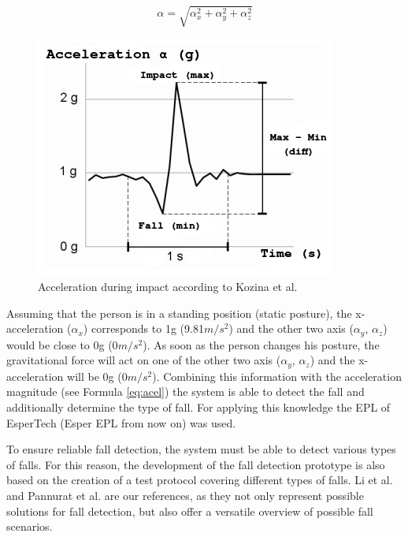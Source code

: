 \documentclass[10pt,journal,compsoc]{IEEEtran}
\begin{document}
\begin{equation}\label{eq:acel}
\alpha = \sqrt{\alpha_{x}^{2} + \alpha_{y}^{2} + \alpha_{z}^{2}}
\end{equation}

\begin{figure}[!ht]
	\centering
	\includegraphics[scale=0.5]{Images/FallGraph}
	\caption[Acceleration during impact]{Acceleration during impact according to Kozina et al.~\cite{Kozina}}
	\label{fig:fallKozina}
\end{figure}
 Assuming that the person is in a standing position (static posture), the x-acceleration ($\alpha_x$) corresponds to 1g (9.81$m/s^{2}$) and the other two axis ($\alpha_y$, $\alpha_z$) would be close to 0g (0$m/s^{2}$). As soon as the person changes his posture, the gravitational force will act on one of the other two axis ($\alpha_y$, $\alpha_z$) and the x-acceleration will be 0g (0$m/s^{2}$). Combining this information with the acceleration magnitude (see Formula \ref{eq:acel}) the system is able to detect the fall and additionally determine the type of fall. For applying this knowledge the EPL of EsperTech (Esper EPL from now on) \cite{Esper:2016} was used.

To ensure reliable fall detection, the system must be able to detect various types of falls. For this reason, the development of the fall detection prototype is also based on the creation of a test protocol covering different types of falls. Li et al. \cite{Li2009} and Pannurat et al. \cite{Pannurat2014} are our references, as they not only represent possible solutions for fall detection, but also offer a versatile overview of possible fall scenarios.
\end{document}
